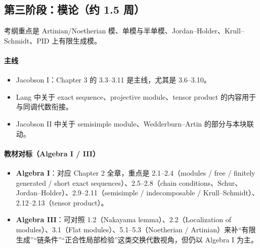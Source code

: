 \documentclass[12pt,a4paper]{ctexart}
\begin{document}
\subsection{第三阶段：模论（约 1.5 周）}

考纲重点是 Artinian/Noetherian 模、单模与半单模、Jordan--Holder、Krull--Schmidt、PID 上有限生成模。

\paragraph{主线}
\begin{itemize}
  \item Jacobson I：Chapter 3 的 3.3--3.11 是主线，尤其是 3.6--3.10。
  \item Lang 中关于 exact sequence、projective module、tensor product 的内容用于与同调代数衔接。
  \item Jacobson II 中关于 semisimple module、Wedderburn--Artin 的部分与本块联动。
\end{itemize}

\paragraph{教材对标（Algebra I / III）}
\begin{itemize}
  \item \textbf{Algebra I}：对应 Chapter 2 全章，重点是 2.1--2.4（modules / free / finitely generated / short exact sequences）、2.5--2.8（chain conditions、Schur、Jordan--Holder）、2.9--2.11（semisimple / indecomposable / Krull--Schmidt）、2.12--2.13（tensor product）。
  \item \textbf{Algebra III}：可对照 1.2（Nakayama lemma）、2.2（Localization of modules）、3.1（Flat modules）、5.1--5.3（Noetherian / Artinian）来补“有限生成”“链条件”“正合性局部检验”这类交换代数视角，但仍以 Algebra I 为主。
\end{itemize}
\end{document}
